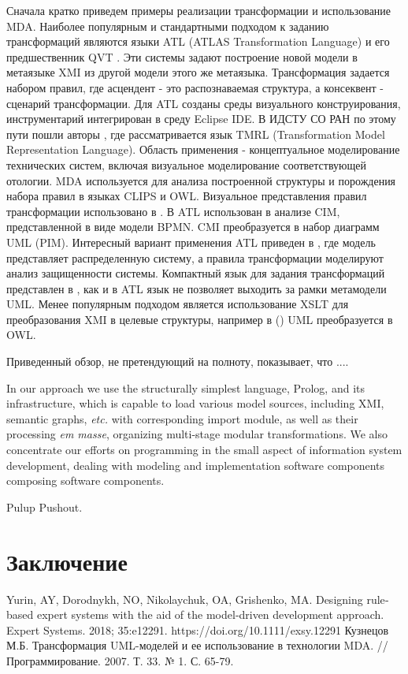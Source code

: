 \documentclass[12pt]{article}
\begin{document}
Сначала кратко приведем примеры реализации трансформации и использование MDA.  Наиболее популярным и стандартными подходом к заданию трансформаций являются языки ATL (ATLAS Transformation Language) \cite{atl} и его предшественник QVT \cite{QVT}.  Эти системы задают построение новой модели в метаязыке XMI из другой модели этого же метаязыка.  Трансформация задается набором правил, где асцендент - это распознаваемая структура, а консеквент - сценарий трансформации.  Для ATL созданы среды визуального конструирования, инструментарий интегрирован в среду Eclipse IDE.  В ИДСТУ СО РАН по этому пути пошли авторы  \cite{nikita}, где рассматривается язык TMRL (Transformation Model Representation Language).  Область применения - концептуальное моделирование технических систем, включая визуальное моделирование соответствующей отологии.  MDA используется для анализа построенной структуры и порождения набора правил в языках CLIPS и OWL.  Визуальное представления правил трансформации использовано в \cite{GT}.   В \cite{azis} ATL использован в анализе CIM, представленной в виде модели BPMN.  CMI преобразуется в набор диаграмм UML (PIM). Интересный вариант применения ATL приведен в \cite{Hamid}, где модель представляет распределенную систему, а правила трансформации моделируют анализ защищенности системы.   Компактный язык для задания трансформаций представлен в \cite{kuz}, как и в ATL язык не позволяет выходить за рамки метамодели UML.  Менее популярным подходом является использование XSLT для преобразования XMI в целевые структуры, например в (\cite{uml2owl}) UML преобразуется в OWL.

Приведенный обзор, не претендующий на полноту, показывает, что ....

In our approach we use the structurally simplest language, Prolog, and its infrastructure, which is capable to load various model sources, including XMI, semantic graphs, \emph{etc.} with corresponding import module, as well as their processing \emph{em masse}, organizing multi-stage modular transformations. We also concentrate our efforts on programming in the small aspect of information system development, dealing with modeling and implementation software components composing software components.

Pulup Pushout.

\section{Заключение}



\renewcommand\bibname{Литература}
\begin{thebibliography}{99}
 Yurin, AY, Dorodnykh, NO, Nikolaychuk, OA, Grishenko, MA. Designing rule‐based expert systems with the aid of the model‐driven development approach. Expert Systems. 2018; 35:e12291. https://doi.org/10.1111/exsy.12291
Кузнецов М.Б. Трансформация UML-моделей и ее использование в технологии MDA. // Программирование. 2007. Т. 33. № 1. С. 65-79.
\end{thebibliography}
\end{document}
